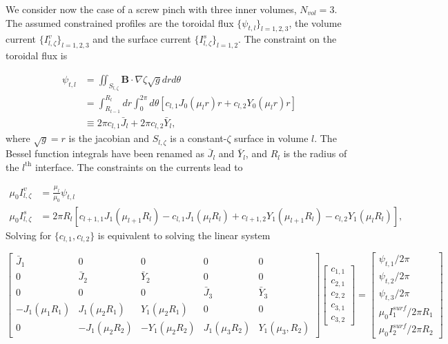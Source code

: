 We consider now the case of a screw pinch with three inner volumes, $N_{vol}=3$. The assumed constrained profiles are the toroidal flux $\{\psi_{t,l}\}_{l=1,2,3}$, the volume current $\{I^{v}_{l,\zeta}\}_{l=1,2,3}$ and the surface current $\{I^{s}_{l,\zeta}\}_{l=1,2}$. The constraint on the toroidal flux is

\begin{align}
	\psi_{t,l} &= \iint_{S_{l,\zeta}} \mathbf{B}\cdot\nabla\zeta \sqrt{g} dr d\theta\\
	&= \int_{R_{l-1}}^{R_l} dr \int_0^{2\pi} d\theta \left[ c_{l,1} J_0(\mu_l r) r + c_{l,2} Y_0(\mu_l r)r \right]\\
	&\equiv 2\pi c_{l,1} \bar{J}_l + 2\pi c_{l,2} \bar{Y}_l,
\end{align}
where $\sqrt{g}=r$ is the jacobian and $S_{l,\zeta}$ is a constant-$\zeta$ surface in volume $l$. The Bessel function integrals have been renamed as $\bar{J}_l$ and $\bar{Y}_l$, and $R_l$ is the radius of the $l^{\text{th}}$ interface. The constraints on the currents lead to

\begin{align}
	\mu_0I^{v}_{l,\zeta} &= \frac{\mu_l}{\mu_0} \psi_{t,l}\\
	\mu_0I^{s}_{l,\zeta} &= 2\pi R_l \left[ c_{l+1,1}J_1(\mu_{l+1}R_l) - c_{l,1}J_1(\mu_{l}R_l) + c_{l+1,2}Y_1(\mu_{l+1}R_l) -
	c_{l,2}Y_1(\mu_{l}R_l)\right],
\end{align}
Solving for $\{c_{l,1},c_{l,2}\}$ is equivalent to solving the linear system

\begin{equation}
	\begin{bmatrix}
		\bar{J}_{1} & 0 & 0 & 0 & 0 \\
		0 & \bar{J}_{2} & \bar{Y}_{2} & 0 & 0 \\
		0 & 0 & 0 & \bar{J}_{3} & \bar{Y}_{3} \\
		-J_1(\mu_1 R_1) & J_1(\mu_2 R_1) & Y_1(\mu_2 R_1) & 0 & 0 \\
		0 & -J_1(\mu_2 R_2) & -Y_1(\mu_2 R_2) & J_1(\mu_3 R_2) & Y_1( \mu_3, R_2)
	\end{bmatrix}
	\begin{bmatrix}
		c_{1,1}\\
		c_{2,1}\\
		c_{2,2}\\
		c_{3,1}\\
		c_{3,2}
	\end{bmatrix}
	=
	\begin{bmatrix}
		\psi_{t,1} / 2\pi\\
		\psi_{t,2} / 2\pi\\
		\psi_{t,3} / 2\pi\\
		\mu_0I^{surf}_1 / 2\pi R_1\\
		\mu_0I^{surf}_2 / 2\pi R_2
	\end{bmatrix} \label{eq.linear_system_constraint_SP}
\end{equation}

